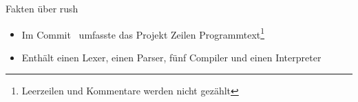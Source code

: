 \begin{frame}{Fakten über rush}
    \begin{itemize}
        \item Im Commit \rushCommit~umfasste das Projekt \rushLoc Zeilen Programmtext\footnote{Leerzeilen und Kommentare werden nicht gezählt}
        \item Enthält einen Lexer, einen Parser, fünf Compiler und einen Interpreter
    \end{itemize}
\end{frame}
